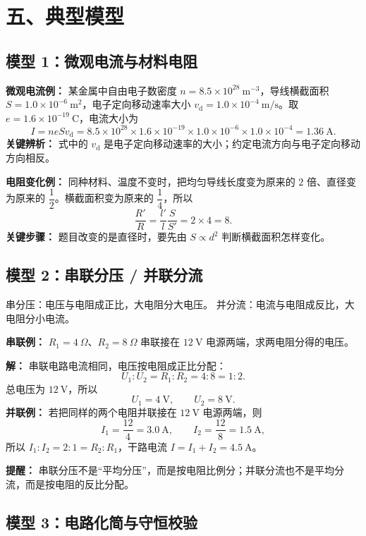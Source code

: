 \section*{五、典型模型}

\subsection*{模型 1：微观电流与材料电阻}

\textbf{微观电流例：} 某金属中自由电子数密度
$n=8.5\times10^{28}\ \mathrm{m^{-3}}$，导线横截面积
$S=1.0\times10^{-6}\ \mathrm{m^2}$，电子定向移动速率大小
$v_{\mathrm d}=1.0\times10^{-4}\ \mathrm{m/s}$。取
$e=1.6\times10^{-19}\ \mathrm C$，电流大小为
\[
I=neSv_{\mathrm d}
=8.5\times10^{28}\times1.6\times10^{-19}
\times1.0\times10^{-6}\times1.0\times10^{-4}
=1.36\ \mathrm A.
\]
\textbf{关键辨析：} 式中的 $v_{\mathrm d}$ 是电子定向移动速率的大小；约定电流方向与电子定向移动方向相反。

\textbf{电阻变化例：} 同种材料、温度不变时，把均匀导线长度变为原来的 $2$ 倍、直径变为原来的 $\dfrac12$。横截面积变为原来的 $\dfrac14$，所以
\[
\frac{R'}{R}
=\frac{l'}{l}\frac{S}{S'}
=2\times4=8.
\]
\textbf{关键步骤：} 题目改变的是直径时，要先由 $S\propto d^2$ 判断横截面积怎样变化。

\subsection*{模型 2：串联分压 / 并联分流}

串分压：电压与电阻成正比，大电阻分大电压。
并分流：电流与电阻成反比，大电阻分小电流。

\textbf{串联例：} $R_1=4\ \Omega$、$R_2=8\ \Omega$ 串联接在 $12\ \mathrm{V}$ 电源两端，求两电阻分得的电压。

\textbf{解：} 串联电路电流相同，电压按电阻成正比分配：
\[
U_1:U_2=R_1:R_2=4:8=1:2.
\]
总电压为 $12\ \mathrm{V}$，所以
\[
U_1=4\ \mathrm{V},\qquad U_2=8\ \mathrm{V}.
\]
\textbf{并联例：} 若把同样的两个电阻并联接在 $12\ \mathrm V$ 电源两端，则
\[
I_1=\frac{12}{4}=3.0\ \mathrm A,\qquad
I_2=\frac{12}{8}=1.5\ \mathrm A,
\]
所以 $I_1:I_2=2:1=R_2:R_1$，干路电流
$I=I_1+I_2=4.5\ \mathrm A$。

\textbf{提醒：} 串联分压不是“平均分压”，而是按电阻比例分；并联分流也不是平均分流，而是按电阻的反比分配。

\subsection*{模型 3：电路化简与守恒校验}

